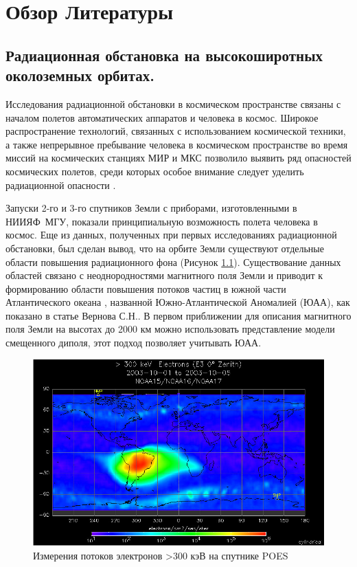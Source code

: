 \chapter{Обзор Литературы} \label{chapt1}

\section{Радиационная обстановка на высокоширотных околоземных орбитах. } \label{sect1_1}

Исследования радиационной обстановки в космическом пространстве связаны с началом полетов автоматических аппаратов и человека в космос.  Широкое распространение технологий, связанных с использованием космической техники, а также непрерывное пребывание человека в космическом пространстве во время миссий на космических станциях МИР и МКС позволило выявить ряд опасностей космических полетов, среди которых особое внимание следует уделить радиационной опасности \cite{logachev2007}.


Запуски 2-го и 3-го спутников Земли с приборами, изготовленными в НИИЯФ~МГУ,  
показали принципиальную возможность полета человека в космос.  Еще из данных, полученных при первых исследованиях радиационной 
обстановки, был сделан вывод, что на орбите Земли существуют отдельные области повышения радиационного фона (Рисунок \ref{fig:cylindricalpoes200310mep}). Существование данных областей связано с неоднородностями 
магнитного поля Земли и приводит к формированию области повышения потоков 
частиц в  
южной части Атлантического океана \cite{logachev2007}, названной Южно-Атлантической 
Аномалией (ЮАА), как показано в статье Вернова С.Н.\cite{vernov1961}. В первом 
приближении для описания магнитного поля  Земли на высотах до 2000 км можно 
использовать представление модели смещенного диполя, этот подход позволяет 
учитывать ЮАА.

\begin{figure}
	\centering
	\includegraphics[width=0.7\linewidth]{images/cylindrical_poes_200310_mep}
	\caption{Измерения потоков электронов >300 кэВ на спутнике POES \cite{Peck2008}}
	\label{fig:cylindricalpoes200310mep}
\end{figure}

